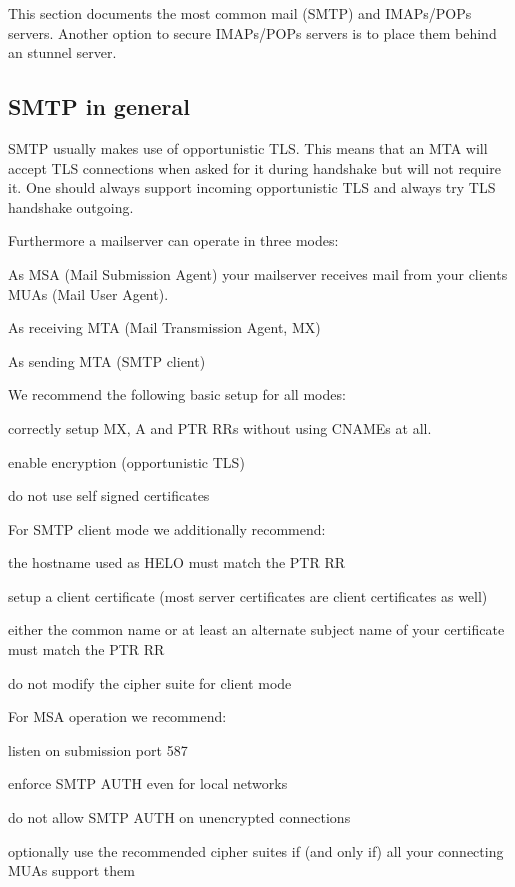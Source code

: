 This section documents the most common mail (SMTP) and IMAPs/POPs servers. Another option to secure IMAPs/POPs servers is to place them behind an stunnel server. 


\subsection{SMTP in general}
\label{subsection:smtp_general}
SMTP usually makes use of opportunistic TLS. This means that an MTA will accept TLS connections when asked for it during handshake but will not require it. One should always support incoming opportunistic TLS and always try TLS handshake outgoing.

Furthermore a mailserver can operate in three modes:
\begin{itemize*}
  \item As MSA (Mail Submission Agent) your mailserver receives mail from your clients MUAs (Mail User Agent).
  \item As receiving MTA (Mail Transmission Agent, MX)
  \item As sending MTA (SMTP client)
\end{itemize*}
We recommend the following basic setup for all modes:
\begin{itemize*}
  \item correctly setup MX, A and PTR RRs without using CNAMEs at all.
  \item enable encryption (opportunistic TLS)
  \item do not use self signed certificates
\end{itemize*}

For SMTP client mode we additionally recommend:
\begin{itemize*}
  \item the hostname used as HELO must match the PTR RR
  \item setup a client certificate (most server certificates are client certificates as well)
  \item either the common name or at least an alternate subject name of your certificate must match the PTR RR
  \item do not modify the cipher suite for client mode
\end{itemize*}

For MSA operation we recommend:
\begin{itemize*}
  \item listen on submission port 587
  \item enforce SMTP AUTH even for local networks
  \item do not allow SMTP AUTH on unencrypted connections
  \item optionally use the recommended cipher suites if (and only if) all your connecting MUAs support them
\end{itemize*}


